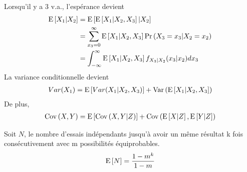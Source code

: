 \documentclass[10pt, french]{article}
\begin{document}
\begin{multicols*}{2}
Lorsqu'il y a 3 v.a., l'espérance devient
\begin{align*}
\mathrm{E} \left[ X_1 | X_2 \right]	& = \mathrm{E} \left[ \mathrm{E} \left[ X_1 | X_2, X_3 \right] | X_2 \right] \\
	& = \sum_{x_3 = 0}^{\infty} \mathrm{E} \left[ X_1 | X_2, X_3 \right] \Pr \left( X_3 = x_3 | X_2 = x_2 \right) \\
	& = \int_{-\infty}^{\infty} \mathrm{E} \left[ X_1 | X_2, X_3 \right] f_{X_3| X_2}(x_3 | x_2) dx_3
\end{align*}
La variance conditionnelle devient
\begin{align*}
Var(X_1) = \mathrm{E} \left[ Var(X_1 | X_2, X_3) \right]  + \mathrm{Var} \left( \mathrm{E} \left[ X_1 | X_2, X_3 \right] \right)
\end{align*}
De plus,
\begin{align*}
\mathrm{Cov} \left( X, Y \right) = \mathrm{E} \left[ \mathrm{Cov} \left( X, Y | Z \right) \right] + \mathrm{Cov} \left( \mathrm{E} \left[ X | Z \right], \mathrm{E} \left[ Y | Z \right] \right)
\end{align*}


Soit $N$, le nombre d'essais indépendants jusqu'à avoir un même résultat k fois consécutivement avec m possibilités équiprobables.
\begin{align*}
	\mathrm{E} \left[ N \right] &= \frac{1 - m^{k}}{1 - m} \\
\end{align*}

%


\end{multicols*}
\end{document}
